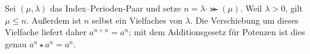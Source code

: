 \documentclass[main.tex]{subfiles}
\begin{document}

Sei \((\mu,\lambda)\) das Index--Perioden-Paar und setze
\(n=\lambda\cdot\Succ(\mu)\).  Weil \(\lambda>0\), gilt
\(\mu\leq n\).  Außerdem ist \(n\) selbst ein Vielfaches von
\(\lambda\).  Die Verschiebung um dieses Vielfache liefert daher
\(a^{n+n}=a^n\); mit dem Additionsgesetz für Potenzen ist dies genau
\(a^n\star a^n=a^n\).
\end{document}
